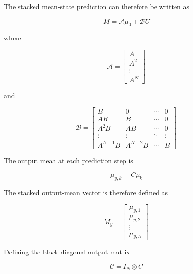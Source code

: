 The stacked mean-state prediction can therefore be written as

\begin{equation}
    \boxed{
        M
        =
        \mathcal{A}\mu_0
        +
        \mathcal{B}U
    }
    \label{eq:stochastic_stacked_state}
\end{equation}

where

\begin{equation}
    \mathcal{A}
    =
    \begin{bmatrix}
        A \\
        A^2 \\
        \vdots \\
        A^N
    \end{bmatrix}
\end{equation}

and

\begin{equation}
    \mathcal{B}
    =
    \begin{bmatrix}
        B & 0 & \cdots & 0 \\
        AB & B & \cdots & 0 \\
        A^2B & AB & \cdots & 0 \\
        \vdots & \vdots & \ddots & \vdots \\
        A^{N-1}B & A^{N-2}B & \cdots & B
    \end{bmatrix}
\end{equation}

The output mean at each prediction step is

\begin{equation}
    \mu_{y,k}=C\mu_k
\end{equation}

The stacked output-mean vector is therefore defined as

\begin{equation}
    M_y
    =
    \begin{bmatrix}
        \mu_{y,1} \\
        \mu_{y,2} \\
        \vdots \\
        \mu_{y,N}
    \end{bmatrix}
\end{equation}

Defining the block-diagonal output matrix

\begin{equation}
    \mathcal{C}
    =
    I_N\otimes C
\end{equation}


